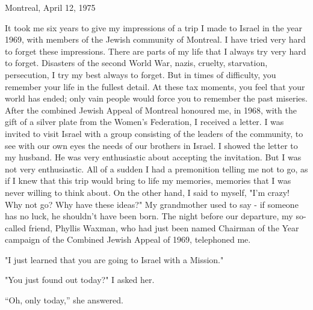 Montreal, April 12, 1975 

It took me six years to give my impressions of a trip I made  to Israel in the year 1969, with members of the Jewish community of Montreal.
I have tried very hard to forget these impressions. 
There are parts of my life that I always try very hard to forget. 
Disasters of the second World War, nazis, cruelty, starvation, persecution, I try my best always to forget. But in times of difficulty, you remember your life in the fullest detail.
At these tax moments, you feel that your world has ended; only vain people would force you to remember the past miseries. 
After the combined Jewish Appeal of Montreal honoured me, in 1968, with the gift of a silver plate from the Women's Federation, I received a letter. I was invited to visit Israel with a group consisting of the leaders of the community, to see with our own eyes the needs of our brothers in Israel.
I showed the letter to my husband. He was very enthusiastic about accepting the invitation.
But I was not very enthusiastic. All of a sudden I had a premonition telling me not to go, as if I knew that this trip would bring to life my memories, memories that I was never willing to think about.
On the other hand, I said to myself, "I'm crazy! Why not go? Why have these ideas?"
My grandmother used to say  - if someone has no luck, he shouldn't have been born. 
The night before our departure, my so-called friend, Phyllis Waxman, who had just been named Chairman of the Year campaign of the Combined Jewish Appeal of 1969, telephoned me. 

"I just learned that you are going to Israel with a Mission." 

"You just found out today?" I asked her. 

“Oh, only today,” she answered.

